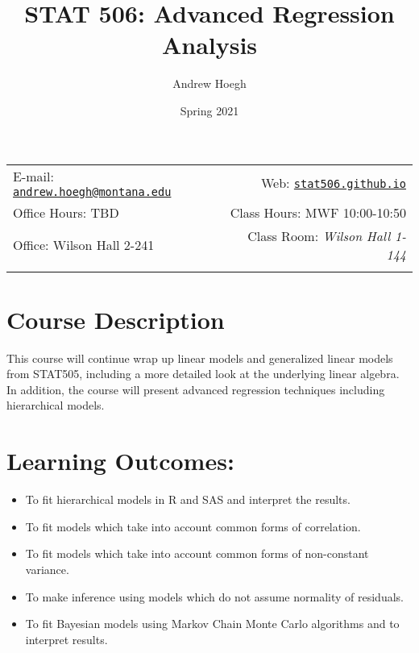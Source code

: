\documentclass[11pt,]{article}
\title{STAT 506: Advanced Regression Analysis}
\author{Andrew Hoegh}
\date{Spring 2021}
\providecommand{\tightlist}{%
  \setlength{\itemsep}{0pt}\setlength{\parskip}{0pt}}
\begin{document}
  

		\maketitle
		
	
		\thispagestyle{firststyle}



	\noindent \begin{tabular*}{\textwidth}{ @{\extracolsep{\fill}} lr @{\extracolsep{\fill}}}


E-mail: \texttt{\href{mailto:andrew.hoegh@montana.edu}{\nolinkurl{andrew.hoegh@montana.edu}}} & Web: \href{http://stat506.github.io}{\tt stat506.github.io}\\
Office Hours: TBD  &  Class Hours: MWF 10:00-10:50\\
Office: Wilson Hall 2-241  & Class Room: \emph{Wilson Hall 1-144}\\
	&  \\
	\hline
	\end{tabular*}
	
\vspace{2mm}
	


\hypertarget{course-description}{%
\section{Course Description}\label{course-description}}

This course will continue wrap up linear models and generalized linear
models from STAT505, including a more detailed look at the underlying
linear algebra. In addition, the course will present advanced regression
techniques including hierarchical models.

\hypertarget{learning-outcomes}{%
\section{Learning Outcomes:}\label{learning-outcomes}}

\begin{itemize}
\tightlist
\item
  To fit hierarchical models in R and SAS and interpret the results.
\item
  To fit models which take into account common forms of correlation.
\item
  To fit models which take into account common forms of non-constant
  variance.
\item
  To make inference using models which do not assume normality of
  residuals.
\item
  To fit Bayesian models using Markov Chain Monte Carlo algorithms and
  to interpret results.
\end{itemize}
\end{document}
